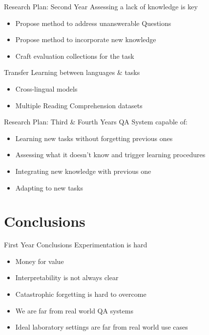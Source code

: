 \documentclass{beamer}
\begin{document}
\begin{frame}{Research Plan: Second Year}
  \alert{\Large Assessing a lack of knowledge is key}
  \begin{itemize}
    \item Propose method to address unanswerable Questions
    \item Propose method to incorporate new knowledge
    \item Craft evaluation collections for the task
  \end{itemize}
  \alert{\Large Transfer Learning between languages \& tasks}
  \begin{itemize}
    \item Cross-lingual models
    \item Multiple Reading Comprehension datasets
  \end{itemize}
\end{frame}


\begin{frame}{Research Plan: Third \& Fourth Years}
  \alert{\Large QA System capable of:}
  \begin{itemize}
    \item Learning new tasks without forgetting previous ones
    \item Assessing what it doesn't know and trigger learning procedures
    \item Integrating new knowledge with previous one
    \item Adapting to new tasks
  \end{itemize}
\end{frame}

\section{Conclusions}
\begin{frame}{First Year Conclusions}
  \alert{\Large Experimentation is hard}
  \begin{itemize}
    \item Money for value
    \item Interpretability is not always clear
    \item Catastrophic forgetting is hard to overcome
    \item We are far from real world QA systems
    \item Ideal laboratory settings are far from real world use cases
  \end{itemize}
\end{frame}
\end{document}
